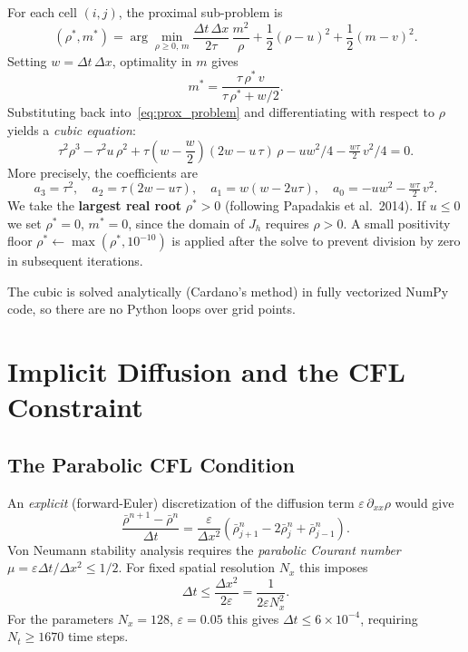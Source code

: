 \documentclass[11pt]{article}
\begin{document}
For each cell $(i,j)$, the proximal sub-problem is
\begin{equation}
  (\rho^*, m^*)
  = \arg\min_{\rho \geq 0,\, m}
    \frac{\Delta t\,\Delta x}{2\tau}\,\frac{m^2}{\rho}
    + \frac{1}{2}(\rho - u)^2 + \frac{1}{2}(m - v)^2.
  \label{eq:prox_problem}
\end{equation}
Setting $w = \Delta t\,\Delta x$, optimality in $m$ gives
\begin{equation}
  m^* = \frac{\tau\,\rho^*\,v}{\tau\,\rho^* + w/2}.
  \label{eq:mstar}
\end{equation}
Substituting back into~\eqref{eq:prox_problem} and differentiating with
respect to $\rho$ yields a \emph{cubic equation}:
\begin{equation}
  \tau^2 \rho^3
  - \tau^2 u\,\rho^2
  + \tau\!\left(w - \frac{w}{2}\right)\!(2w - u\,\tau)\,\rho
  - uw^2/4
  - \tfrac{w\tau}{2}\,v^2/4 = 0.
  \label{eq:cubic}
\end{equation}
More precisely, the coefficients are
\begin{equation}
  a_3 = \tau^2, \quad
  a_2 = \tau(2w - u\tau), \quad
  a_1 = w(w - 2u\tau), \quad
  a_0 = -uw^2 - \tfrac{w\tau}{2}\,v^2.
\end{equation}
We take the \textbf{largest real root} $\rho^* > 0$ (following Papadakis
et al.\ 2014).  If $u \leq 0$ we set $\rho^* = 0$, $m^* = 0$, since the
domain of $J_h$ requires $\rho > 0$.  A small positivity floor
$\rho^* \leftarrow \max(\rho^*, 10^{-10})$ is applied after the solve to
prevent division by zero in subsequent iterations.

The cubic is solved analytically (Cardano's method) in fully vectorized
NumPy code, so there are no Python loops over grid points.

\section{Implicit Diffusion and the CFL Constraint}\label{sec:implicit}

\subsection{The Parabolic CFL Condition}

An \emph{explicit} (forward-Euler) discretization of the diffusion term
$\varepsilon\,\partial_{xx}\rho$ would give
\[
  \frac{\bar\rho^{n+1} - \bar\rho^n}{\Delta t}
  = \frac{\varepsilon}{\Delta x^2}(\bar\rho^n_{j+1} - 2\bar\rho^n_j + \bar\rho^n_{j-1}).
\]
Von Neumann stability analysis requires the \emph{parabolic Courant number}
$\mu = \varepsilon\Delta t/\Delta x^2 \leq 1/2$.  For fixed spatial
resolution $N_x$ this imposes
\begin{equation}
  \Delta t \leq \frac{\Delta x^2}{2\varepsilon}
  = \frac{1}{2\varepsilon N_x^2}.
  \label{eq:CFL}
\end{equation}
For the parameters $N_x = 128$, $\varepsilon = 0.05$ this gives
$\Delta t \leq 6\times10^{-4}$, requiring $N_t \geq 1670$ time steps.
\end{document}
